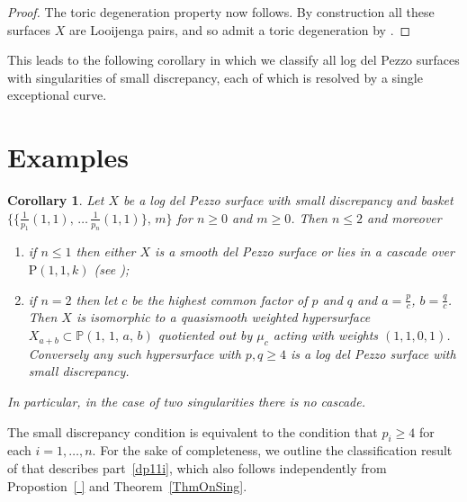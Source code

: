 \documentclass[11pt]{amsbook}
\theoremstyle{plain}
\newtheorem{cor}[thm]{Corollary}
\newcommand{\mb}[1]{\mathbb{#1}}
\newcommand{\LJ}{Looijenga pair}
\renewcommand{\P}{\mathrm{P}}
\begin{document}
\begin{proof}
The toric degeneration property now follows. By construction all these surfaces $X$ are \LJ s,
and so admit a toric degeneration by \cite[Theorem ??]{GHK}.
\end{proof}


This leads to the following corollary in which we classify all log del Pezzo surfaces with singularities of small discrepancy, each of which is resolved by a single exceptional curve.
 
\section{Examples}
 
\begin{cor}
Let $X$ be a log del Pezzo surface with small discrepancy and
basket  $\{ \{ \frac{1}{p_1}(1,1), \, \dots \, \frac{1}{p_n}(1,1) \}, \, m \}$
for $n\ge0$ and $m\ge0$. Then $n\le2$ and moreover
\begin{enumerate}
\item\label{dp11i}
if $n\le1$ then either $X$ is a smooth del Pezzo surface or 
lies in a cascade over $\P(1,1,k)$ (see \cite[Table ??]{CP});
\item\label{dp11ii}
if $n=2$ then let $c$ be the highest common factor of $p$ and $q$ and $a = \frac{p}{c}$, $b = \frac{q}{c}$. Then $X$
is isomorphic to a quasismooth weighted hypersurface
$X_{a+b}\subset \mb{P}(1,\,1,\,a,\,b)$ quotiented out by $\mu_c$ acting with weights $(1,1,0,1)$. Conversely any such hypersurface with $p,q\ge4$ is
a log del Pezzo surface with small discrepancy.
\end{enumerate}
In particular, in the case of two singularities there is no cascade.
\end{cor}

The small discrepancy condition is equivalent to the condition that
$p_i \geq 4$ for each $i=1,\dots,n$. 
For the sake of completeness, we outline the classification result of \cite{CP} that
describes part~\ref{dp11i}, which also follows independently from Propostion~\ref{ } and Theorem~\ref{ThmOnSing}.
\end{document}
